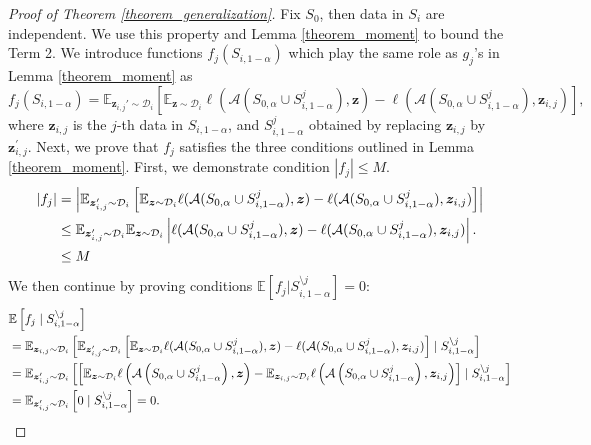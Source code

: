 \begin{proof}[Proof of Theorem \ref{theorem_generalization}]
Fix $S_0$, then data in $S_i$ are independent. We use this property and Lemma \ref{theorem_moment} to bound the Term 2.
We introduce functions $f_j(S_{i,1-\alpha})$ which play the same role as $g_j$'s in Lemma \ref{theorem_moment} as
$$
f_j(S_{i,1-\alpha})=\mathbb{E}_{\boldsymbol{z}_{i,j}'\sim\mathcal{D}_i}\left[\mathbb{E}_{\boldsymbol{z}\sim\mathcal{D}_i}\ell(\mathcal{A}(S_{0,\alpha}\cup S_{i,1-\alpha}^j),\boldsymbol{z})-\ell(\mathcal{A}(S_{0,\alpha}\cup S_{i,1-\alpha}^j),\boldsymbol{z}_{i,j})\right],
$$
where $\boldsymbol{z}_{i,j}$ is the $j$-th data in $S_{i,1-\alpha}$, and $S_{i,1-\alpha}^j$ obtained by replacing $\boldsymbol{z}_{i,j}$ by $\boldsymbol{z}_{i,j}^{\prime}.$ Next, we prove that $f_j$ satisfies the three conditions outlined in Lemma \ref{theorem_moment}. First, we demonstrate condition $|f_j|\leq M$.
\begin{align}
|f_{j}| &=\left|\mathbb{E}_{\boldsymbol{z}_{i,j}'\sim\mathcal{D}_i}\left[\mathbb{E}_{\boldsymbol{z}\sim\mathcal{D}_i}\ell(\mathcal{A}(S_{0,\alpha}\cup S_{i,1-\alpha}^j),\boldsymbol{z})-\ell(\mathcal{A}(S_{0,\alpha}\cup S_{i,1-\alpha}^j),\boldsymbol{z}_{i,j})\right]\right| \notag\\
&\leq  \mathbb{E}_{\boldsymbol{z}_{i,j}'\sim\mathcal{D}_i}\mathbb{E}_{\boldsymbol{z}\sim\mathcal{D}_i}\left|\ell(\mathcal{A}(S_{0,\alpha}\cup S_{i,1-\alpha}^j),\boldsymbol{z})-\ell(\mathcal{A}(S_{0,\alpha}\cup S_{i,1-\alpha}^j),\boldsymbol{z}_{i,j})\right|\notag. \\
&\leq M \notag
\end{align}
We then continue by proving conditions $\mathbb{E}[f_j|S_{i,1-\alpha}^{\setminus j}]=0$:
\begin{align}
&\mathbb{E}\left[f_j \mid S_{i,1-\alpha}^{\backslash j}\right] \notag \\
& =\mathbb{E}_{\boldsymbol{z}_{i,j} \sim \mathcal{D}_i}\left[\mathbb{E}_{\boldsymbol{z}_{i,j}'\sim\mathcal{D}_i}\left[\mathbb{E}_{\boldsymbol{z}\sim\mathcal{D}_i}\ell(\mathcal{A}(S_{0,\alpha}\cup S_{i,1-\alpha}^j),\boldsymbol{z})-\ell(\mathcal{A}(S_{0,\alpha}\cup S_{i,1-\alpha}^j),\boldsymbol{z}_{i,j})\right] \mid S_{i,1-\alpha}^{\backslash j}\right] \notag \\
& =\mathbb{E}_{\boldsymbol{z}_{i,j}'\sim\mathcal{D}_i}\left[\left[\mathbb{E}_{\boldsymbol{z} \sim \mathcal{D}_i} \ell\left(\mathcal{A}\left(S_{0,\alpha} \cup S_{i,1-\alpha}^j\right), \boldsymbol{z}\right)-\mathbb{E}_{\boldsymbol{z}_{i,j} \sim \mathcal{D}_i} \ell\left(\mathcal{A}\left(S_{0,\alpha} \cup S_{i,1-\alpha}^j\right), \boldsymbol{z}_{i,j}\right)\right] \mid S_{i,1-\alpha}^{\backslash j}\right] \notag\\
& =\mathbb{E}_{\boldsymbol{z}_{i,j}'\sim\mathcal{D}_i}\left[0 \mid S_{i,1-\alpha}^{\backslash j}\right]=0. \notag
\end{align}



\end{proof}
